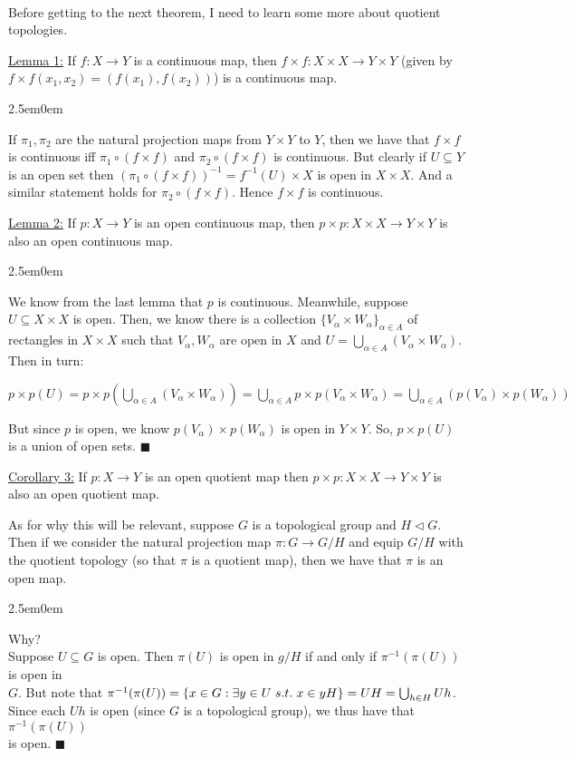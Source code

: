 \documentclass{book}
\newcommand{\pracOne}{
   \color{BrickRed}%
   \fontsize{13}{15}\selectfont%
}
\newcommand{\pracTwo}{
   \color{Orange}%
   \fontsize{12}{14}\selectfont%
}
\newenvironment{myIndent}{%
   \begin{adjustwidth}{2.5em}{0em}%
}{%
   \end{adjustwidth}%
}
\newcommand{\suchthat}{ \hspace{0.3em}s.t.\hspace{0.3em}}
\newcommand{\mySepTwo}[1][.]{%
   {\noindent\color{#1}{\rule{6.5in}{0.5mm}}}\\%
}
\newcommand{\retTwo}{\hfill\bigbreak}
\begin{document}
\setul{0.14em}{0.07em}
\calibri

\pracOne\mySepTwo
Before getting to the next theorem, I need to learn some more about quotient topologies.\retTwo

\ul{Lemma 1:} If $f: X \to Y$ is a continuous map, then $f \times f: X \times X \to Y \times Y$ (given by $f \times f(x_1, x_2) = (f(x_1), f(x_2))$) is a continuous map.
\begin{myIndent}\pracTwo
	If $\pi_1, \pi_2$ are the natural projection maps from $Y \times Y$ to $Y$, then we have that $f \times f$ is continuous iff $\pi_1 \circ (f \times f)$ and $\pi_2 \circ (f \times f)$ is continuous. But clearly if $U \subseteq Y$ is an open set then $(\pi_1 \circ (f \times f))^{-1} = f^{-1}(U) \times X$ is open in $X \times X$. And a similar statement holds for $\pi_2 \circ (f \times f)$. Hence $f \times f$ is continuous.\retTwo
\end{myIndent}

\ul{Lemma 2:} If $p: X \to Y$ is an open continuous map, then $p \times p: X \times X \to Y \times Y$ is also an open continuous map.
\begin{myIndent}\pracTwo
	We know from the last lemma that $p$ is continuous. Meanwhile, suppose $U \subseteq X \times X$ is open. Then, we know there is a collection $\{V_\alpha \times W_\alpha\}_{\alpha \in A}$ of rectangles in $X \times X$ such that $V_\alpha, W_\alpha$ are open in $X$ and $U = \bigcup_{\alpha \in A}(V_\alpha \times W_\alpha)$. Then in turn:

	{\center $p \times p(U) = p \times p(\bigcup\limits_{\alpha \in A} (V_\alpha \times W_\alpha)) = \bigcup\limits_{\alpha \in A}p \times p(V_\alpha \times W_\alpha) = \bigcup\limits_{\alpha \in A}(p(V_\alpha) \times p(W_\alpha))$ \retTwo\par}

	But since $p$ is open, we know $p(V_\alpha) \times p(W_\alpha)$ is open in $Y \times Y$. So, $p \times p(U)$ is a union of open sets. $\blacksquare$\retTwo
\end{myIndent}

\ul{Corollary 3:} If $p: X \to Y$ is an open quotient map then $p \times p: X \times X \to Y \times Y$ is also an open quotient map.\retTwo

As for why this will be relevant, suppose $G$ is a topological group and $H \lhd G$. Then if we consider the natural projection map $\pi: G \to G/H$ and equip $G/H$ with the quotient topology (so that $\pi$ is a quotient map), then we have that $\pi$ is an open map.
\begin{myIndent}\pracTwo
	Why?\\
	Suppose $U \subseteq G$ is open. Then $\pi(U)$ is open in $g/H$ if and only if $\pi^{-1}(\pi(U))$ is open in\\ [1pt] $G$. But note that $\pi^{-1}(\pi(U)) = \{x \in G : \exists y \in U \suchthat x \in yH\} = UH = \bigcup_{h \in H}Uh$.\\ [1pt] Since each $Uh$ is open (since $G$ is a topological group), we thus have that $\pi^{-1}(\pi(U))$\\ [1pt] is open. $\blacksquare$\retTwo
\end{myIndent}
\end{document}
